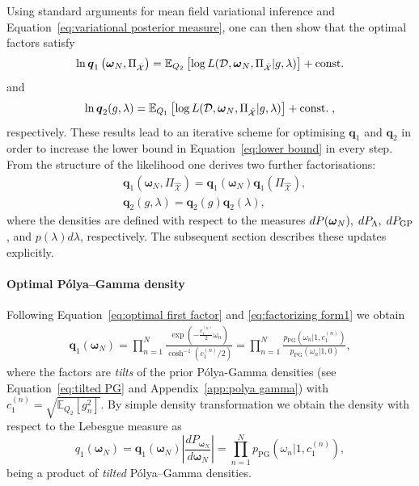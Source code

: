 \documentclass[twoside,11pt]{article}
\newcommand{\dataset}{{\cal D}}
\newcommand{\EE}[2]{\mathbb{E}_{#1}\left[ #2 \right]}
\newcommand{\bs}[1]{\boldsymbol{#1}}
\newcommand{\bomega}{\boldsymbol{\omega}}
\newcommand{\PG}{p_{\scriptscriptstyle \mathrm{PG}}}
\newcommand{\X}{\mathcal{X}}
\begin{document}
Using standard arguments for mean field variational inference \citep[chap. 10]{bishop2006pattern} and Equation~\eqref{eq:variational posterior measure}, one can then show
that the optimal factors satisfy
\begin{equation}\label{eq:optimal first factor}
\ln \bs{q}_1\left(\bomega_N, \Pi_{\hat{\X}}\right) =  \EE{Q_2}{\log L(\dataset, \bomega_N, \Pi_{\hat{\X}} \vert
g, \lambda)  } + \mbox{const.}
\end{equation}
and
\begin{equation}\label{eq:optimalq2}
\ln \bs{q}_2(g,\lambda) =  \EE{Q_1}{\log L(\dataset, \bomega_N, \Pi_{\hat{\X}} \vert g, \lambda) } + \mbox{const.}\;,
\end{equation}
respectively. These results lead to an iterative scheme for optimising $\bs{q}_1$ and $\bs{q}_2$ in order to increase
the lower bound in Equation~\eqref{eq:lower bound} in every step. 
From the structure of the likelihood one derives two further factorisations:
\begin{align}\label{eq:factorizing form1}
& \bs{q}_1(\bomega_N, \Pi_{\hat{\X}}) = \bs{q}_1(\bomega_N) \bs{q}_1(\Pi_{\hat{\X}}), \\
\label{eq:factorizing form2}
& \bs{q}_2(g,\lambda) = \bs{q}_2(g) \bs{q}_2(\lambda),
\end{align}
where the densities are defined with respect to the measures $dP(\bomega_N),\; dP_\Lambda,\; dP_{\rm GP}$, and $p(\lambda)d\lambda$, respectively. The subsequent section describes these updates explicitly.
\paragraph{Optimal P\'olya--Gamma density}
Following Equation~\eqref{eq:optimal first factor} and \eqref{eq:factorizing form1} we obtain
\begin{equation}
\begin{split}
\bs{q}_1(\bomega_N) = \prod_{n=1}^N \frac{\exp\left(-\frac{c_1^{(n)}}{2}\omega_n\right)}{\cosh^{-1}\left(c_1^{(n)}/2\right)} = \prod_{n=1}^N \frac{\PG\left(\omega_n \vert 1, c_{1}^{(n)}\right)}{\PG\left(\omega_n \vert 1, 0\right)},
\end{split}
\end{equation}
where the factors are {\it tilts} of the prior P\'olya-Gamma densities (see Equation~\eqref{eq:tilted PG} and Appendix~\ref{app:polya gamma}) with $c_1^{(n)}=\sqrt{\EE{Q_2}{g_n^2}}$. By simple density transformation we obtain the density with respect to the Lebesgue measure as
\begin{equation}\label{eq:polya gamma obs}
q_1(\bomega_N) = \bs{q}_1(\bomega_N)\left\vert \frac{dP_{\bomega_N}}{d\bomega_N} \right\vert =  \prod_{n=1}^N \PG\left(\omega_n \vert 1, c_{1}^{(n)}\right),
\end{equation}
being a product of {\it tilted} P\'olya--Gamma densities.
\end{document}
